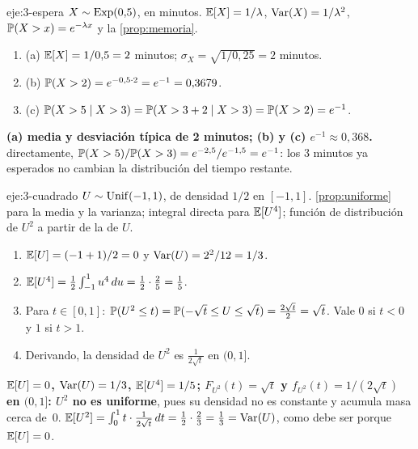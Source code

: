 \begin{solucion}{eje:3-espera}
\datos $X\sim\operatorname{Exp}(0{,}5)$, en minutos.
\planteamiento $\mathbb{E}[X]=1/\lambda$, $\operatorname{Var}(X)=1/\lambda^{2}$, $\mathbb{P}(X>x)=e^{-\lambda x}$ y la \cref{prop:memoria}.
\pasos
\begin{enumerate}[label=\arabic*.]
  \item (a) $\mathbb{E}[X]=1/0{,}5=2$ minutos; $\sigma_X=\sqrt{1/0{,}25}=2$ minutos.
  \item (b) $\mathbb{P}(X>2)=e^{-0{,}5\cdot 2}=e^{-1}=0{,}3679$.
  \item (c) $\mathbb{P}(X>5\mid X>3)=\mathbb{P}(X>3+2\mid X>3)=\mathbb{P}(X>2)=e^{-1}$.
\end{enumerate}
\resultado \textbf{(a) media y desviación típica de 2 minutos; (b) y (c) $e^{-1}\approx 0{,}368$.}
\comprobacion directamente, $\mathbb{P}(X>5)/\mathbb{P}(X>3)=e^{-2{,}5}/e^{-1{,}5}=e^{-1}$: los 3 minutos ya esperados no cambian la distribución del tiempo restante.
\end{solucion}

\begin{solucion}{eje:3-cuadrado}
\datos $U\sim\operatorname{Unif}(-1,1)$, de densidad $1/2$ en $[-1,1]$.
\planteamiento \cref{prop:uniforme} para la media y la varianza; integral directa para $\mathbb{E}[U^{4}]$; función de distribución de $U^{2}$ a partir de la de $U$.
\pasos
\begin{enumerate}[label=\arabic*.]
  \item $\mathbb{E}[U]=(-1+1)/2=0$ y $\operatorname{Var}(U)=2^{2}/12=1/3$.
  \item $\mathbb{E}[U^{4}]=\frac12\int_{-1}^{1}u^{4}\,du=\frac12\cdot\frac{2}{5}=\frac15$.
  \item Para $t\in[0,1]$: $\mathbb{P}(U^{2}\le t)=\mathbb{P}(-\sqrt t\le U\le\sqrt t)=\frac{2\sqrt t}{2}=\sqrt t$. Vale $0$ si $t<0$ y $1$ si $t>1$.
  \item Derivando, la densidad de $U^{2}$ es $\frac{1}{2\sqrt t}$ en $(0,1]$.
\end{enumerate}
\resultado \textbf{$\mathbb{E}[U]=0$, $\operatorname{Var}(U)=1/3$, $\mathbb{E}[U^{4}]=1/5$; $F_{U^{2}}(t)=\sqrt t$ y $f_{U^{2}}(t)=1/(2\sqrt t)$ en $(0,1]$: $U^{2}$ no es uniforme}, pues su densidad no es constante y acumula masa cerca de~0.
\comprobacion $\mathbb{E}[U^{2}]=\int_0^1 t\cdot\frac{1}{2\sqrt t}\,dt=\frac12\cdot\frac23=\frac13=\operatorname{Var}(U)$, como debe ser porque $\mathbb{E}[U]=0$.
\end{solucion}

